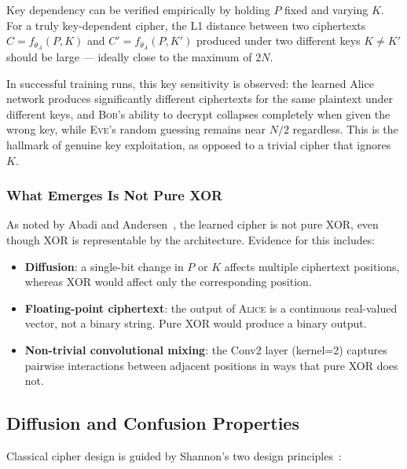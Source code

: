 \documentclass[12pt, a4paper]{article}
\newcommand{\alice}{\textsc{Alice}}
\newcommand{\bob}{\textsc{Bob}}
\newcommand{\eve}{\textsc{Eve}}
\newcommand{\thetaA}{\theta_{\!A}}
\begin{document}
Key dependency can be verified empirically by holding $P$ fixed and
varying $K$. For a truly key-dependent cipher, the L1 distance between
two ciphertexts $C = f_{\thetaA}(P, K)$ and $C' = f_{\thetaA}(P, K')$
produced under two different keys $K \neq K'$ should be large --- ideally
close to the maximum of $2N$.

In successful training runs, this key sensitivity is observed: the
learned Alice network produces significantly different ciphertexts for
the same plaintext under different keys, and \bob{}'s ability to decrypt
collapses completely when given the wrong key, while \eve{}'s random
guessing remains near $N/2$ regardless. This is the hallmark of
genuine key exploitation, as opposed to a trivial cipher that ignores $K$.

\subsubsection*{What Emerges Is Not Pure XOR}

As noted by Abadi and Andersen~\cite{abadi2016learning}, the learned
cipher is not pure XOR, even though XOR is representable by the
architecture. Evidence for this includes:

\begin{itemize}[leftmargin=1.8em, itemsep=4pt]
  \item \textbf{Diffusion}: a single-bit change in $P$ or $K$ affects
        multiple ciphertext positions, whereas XOR would affect only
        the corresponding position.
  \item \textbf{Floating-point ciphertext}: the output of
        \alice{} is a continuous real-valued vector, not a binary
        string. Pure XOR would produce a binary output.
  \item \textbf{Non-trivial convolutional mixing}: the Conv2
        layer (kernel=2) captures pairwise interactions between adjacent
        positions in ways that pure XOR does not.
\end{itemize}

\subsection{Diffusion and Confusion Properties}
\label{subsec:diffusion_confusion}

Classical cipher design is guided by Shannon's two design
principles~\cite{shannon1949communication}:
\end{document}
